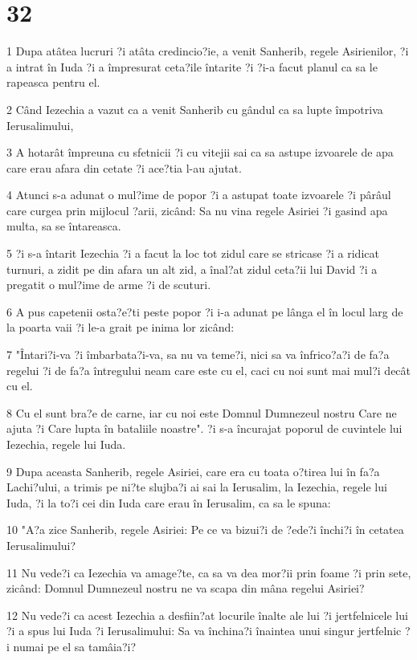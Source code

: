 \chapter{32}

\par 1 Dupa atâtea lucruri ?i atâta credincio?ie, a venit Sanherib, regele Asirienilor, ?i a intrat în Iuda ?i a împresurat ceta?ile întarite ?i ?i-a facut planul ca sa le rapeasca pentru el.
\par 2 Când Iezechia a vazut ca a venit Sanherib cu gândul ca sa lupte împotriva Ierusalimului,
\par 3 A hotarât împreuna cu sfetnicii ?i cu vitejii sai ca sa astupe izvoarele de apa care erau afara din cetate ?i ace?tia l-au ajutat.
\par 4 Atunci s-a adunat o mul?ime de popor ?i a astupat toate izvoarele ?i pârâul care curgea prin mijlocul ?arii, zicând: Sa nu vina regele Asiriei ?i gasind apa multa, sa se întareasca.
\par 5 ?i s-a întarit Iezechia ?i a facut la loc tot zidul care se stricase ?i a ridicat turnuri, a zidit pe din afara un alt zid, a înal?at zidul ceta?ii lui David ?i a pregatit o mul?ime de arme ?i de scuturi.
\par 6 A pus capetenii osta?e?ti peste popor ?i i-a adunat pe lânga el în locul larg de la poarta vaii ?i le-a grait pe inima lor zicând:
\par 7 "Întari?i-va ?i îmbarbata?i-va, sa nu va teme?i, nici sa va înfrico?a?i de fa?a regelui ?i de fa?a întregului neam care este cu el, caci cu noi sunt mai mul?i decât cu el.
\par 8 Cu el sunt bra?e de carne, iar cu noi este Domnul Dumnezeul nostru Care ne ajuta ?i Care lupta în bataliile noastre". ?i s-a încurajat poporul de cuvintele lui Iezechia, regele lui Iuda.
\par 9 Dupa aceasta Sanherib, regele Asiriei, care era cu toata o?tirea lui în fa?a Lachi?ului, a trimis pe ni?te slujba?i ai sai la Ierusalim, la Iezechia, regele lui Iuda, ?i la to?i cei din Iuda care erau în Ierusalim, ca sa le spuna:
\par 10 "A?a zice Sanherib, regele Asiriei: Pe ce va bizui?i de ?ede?i închi?i în cetatea Ierusalimului?
\par 11 Nu vede?i ca Iezechia va amage?te, ca sa va dea mor?ii prin foame ?i prin sete, zicând: Domnul Dumnezeul nostru ne va scapa din mâna regelui Asiriei?
\par 12 Nu vede?i ca acest Iezechia a desfiin?at locurile înalte ale lui ?i jertfelnicele lui ?i a spus lui Iuda ?i Ierusalimului: Sa va închina?i înaintea unui singur jertfelnic ?i numai pe el sa tamâia?i?
